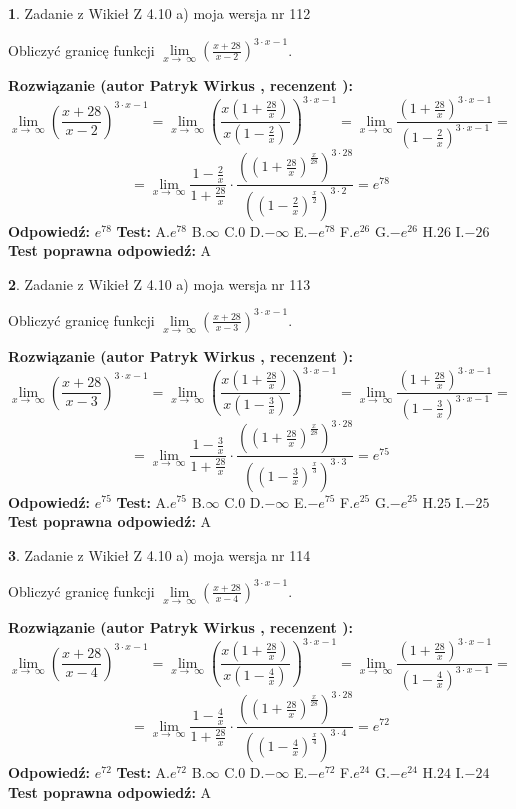 \documentclass[12pt, a4paper]{article}
\theoremstyle{definition} %
\newtheorem{zad}{}
\newcommand{\zadStart}[1]{\begin{zad}#1\newline}
\newcommand{\zadStop}{\end{zad}}
\newcommand{\rozwStart}[2]{\noindent \textbf{Rozwiązanie (autor #1 , recenzent #2): }\newline}
\newcommand{\rozwStop}{\newline}
\newcommand{\odpStart}{\noindent \textbf{Odpowiedź:}\newline}
\newcommand{\odpStop}{\newline}
\newcommand{\testStart}{\noindent \textbf{Test:}\newline}
\newcommand{\testStop}{\newline}
\newcommand{\kluczStart}{\noindent \textbf{Test poprawna odpowiedź:}\newline}
\newcommand{\kluczStop}{\newline}
\begin{document}
\zadStart{Zadanie z Wikieł Z 4.10 a) moja wersja nr 112}

Obliczyć granicę funkcji  $\lim\limits_{x\to\ \infty}(\frac{x+28}{x-2})^{3\cdot x-1}$.
\zadStop
\rozwStart{Patryk Wirkus}{}
$$\lim\limits_{x\to\ \infty}(\frac{x+28}{x-2})^{3\cdot x-1} = \lim\limits_{x\to\ \infty}(\frac{x(1+\frac{28}{x})}{x(1-\frac{2}{x})})^{3\cdot x-1}=\lim\limits_{x\to\ \infty}\frac{(1+\frac{28}{x})^{3\cdot x-1}}{(1-\frac{2}{x})^{3\cdot x-1}}=$$
$$=\lim\limits_{x\to\ \infty}\frac{1-\frac{2}{x}}{1+\frac{28}{x}}\cdot\frac{((1+\frac{28}{x})^{\frac{x}{28}})^{3\cdot28}}{((1-\frac{2}{x})^{\frac{x}{2}})^{3\cdot2}}=e^{78}$$
\rozwStop
\odpStart
$e^{78}$
\odpStop
\testStart
A.$e^{78}$ B.$\infty$ C.$0$ D.$-\infty$ E.$-e^{78}$
F.$e^{26}$ G.$-e^{26}$
H.$26$
I.$-26$
\testStop
\kluczStart
A
\kluczStop



\zadStart{Zadanie z Wikieł Z 4.10 a) moja wersja nr 113}

Obliczyć granicę funkcji  $\lim\limits_{x\to\ \infty}(\frac{x+28}{x-3})^{3\cdot x-1}$.
\zadStop
\rozwStart{Patryk Wirkus}{}
$$\lim\limits_{x\to\ \infty}(\frac{x+28}{x-3})^{3\cdot x-1} = \lim\limits_{x\to\ \infty}(\frac{x(1+\frac{28}{x})}{x(1-\frac{3}{x})})^{3\cdot x-1}=\lim\limits_{x\to\ \infty}\frac{(1+\frac{28}{x})^{3\cdot x-1}}{(1-\frac{3}{x})^{3\cdot x-1}}=$$
$$=\lim\limits_{x\to\ \infty}\frac{1-\frac{3}{x}}{1+\frac{28}{x}}\cdot\frac{((1+\frac{28}{x})^{\frac{x}{28}})^{3\cdot28}}{((1-\frac{3}{x})^{\frac{x}{3}})^{3\cdot3}}=e^{75}$$
\rozwStop
\odpStart
$e^{75}$
\odpStop
\testStart
A.$e^{75}$ B.$\infty$ C.$0$ D.$-\infty$ E.$-e^{75}$
F.$e^{25}$ G.$-e^{25}$
H.$25$
I.$-25$
\testStop
\kluczStart
A
\kluczStop



\zadStart{Zadanie z Wikieł Z 4.10 a) moja wersja nr 114}

Obliczyć granicę funkcji  $\lim\limits_{x\to\ \infty}(\frac{x+28}{x-4})^{3\cdot x-1}$.
\zadStop
\rozwStart{Patryk Wirkus}{}
$$\lim\limits_{x\to\ \infty}(\frac{x+28}{x-4})^{3\cdot x-1} = \lim\limits_{x\to\ \infty}(\frac{x(1+\frac{28}{x})}{x(1-\frac{4}{x})})^{3\cdot x-1}=\lim\limits_{x\to\ \infty}\frac{(1+\frac{28}{x})^{3\cdot x-1}}{(1-\frac{4}{x})^{3\cdot x-1}}=$$
$$=\lim\limits_{x\to\ \infty}\frac{1-\frac{4}{x}}{1+\frac{28}{x}}\cdot\frac{((1+\frac{28}{x})^{\frac{x}{28}})^{3\cdot28}}{((1-\frac{4}{x})^{\frac{x}{4}})^{3\cdot4}}=e^{72}$$
\rozwStop
\odpStart
$e^{72}$
\odpStop
\testStart
A.$e^{72}$ B.$\infty$ C.$0$ D.$-\infty$ E.$-e^{72}$
F.$e^{24}$ G.$-e^{24}$
H.$24$
I.$-24$
\testStop
\kluczStart
A
\kluczStop
\end{document}
